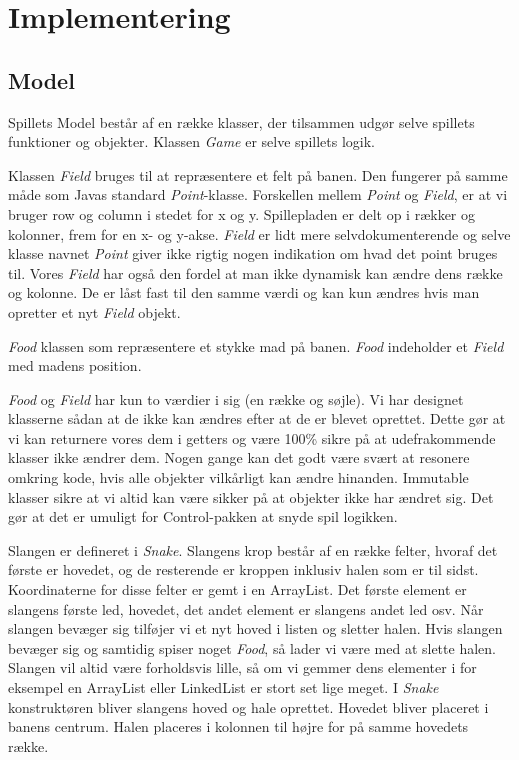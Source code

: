 \section{Implementering}

\subsection{Model}
Spillets Model består af en række klasser, der tilsammen udgør selve spillets funktioner og objekter. Klassen \textit{Game} er selve spillets logik.

Klassen \textit{Field} bruges til at repræsentere et felt på banen. Den fungerer på samme måde som Javas standard \textit{Point}-klasse. Forskellen mellem \textit{Point} og \textit{Field}, er at vi bruger row og column i stedet for x og y. Spillepladen er delt op i rækker og kolonner, frem for en x- og y-akse. \textit{Field} er lidt mere selvdokumenterende og selve klasse navnet \textit{Point} giver ikke rigtig nogen indikation om hvad det point bruges til. Vores \textit{Field} har også den fordel at man ikke dynamisk kan ændre dens række og kolonne. De er låst fast til den samme værdi og kan kun ændres hvis man opretter et nyt \textit{Field} objekt.

\textit{Food} klassen som repræsentere et stykke mad på banen. \textit{Food} indeholder et \textit{Field} med madens position.

\textit{Food} og \textit{Field} har kun to værdier i sig (en række og søjle). Vi har designet klasserne sådan at de ikke kan ændres efter at de er blevet oprettet. Dette gør at vi kan returnere vores dem i getters og være 100\% sikre på at udefrakommende klasser ikke ændrer dem. Nogen gange kan det godt være svært at resonere omkring kode, hvis alle objekter vilkårligt kan ændre hinanden. Immutable klasser sikre at vi altid kan være sikker på at objekter ikke har ændret sig. Det gør at det er umuligt for Control-pakken at snyde spil logikken.

Slangen er defineret i \textit{Snake}. Slangens krop består af en række felter, hvoraf det første er hovedet, og de resterende er kroppen inklusiv halen som er til sidst. Koordinaterne for disse felter er gemt i en ArrayList. Det første element er slangens første led, hovedet, det andet element er slangens andet led osv. Når slangen bevæger sig tilføjer vi et nyt hoved i listen og sletter halen. Hvis slangen bevæger sig og samtidig spiser noget \textit{Food}, så lader vi være med at slette halen. Slangen vil altid være forholdsvis lille, så om vi gemmer dens elementer i for eksempel en ArrayList eller LinkedList er stort set lige meget. I \textit{Snake} konstruktøren bliver slangens hoved og hale oprettet. Hovedet bliver placeret i banens centrum. Halen placeres i kolonnen til højre for på samme hovedets række.

